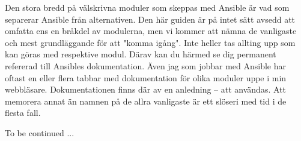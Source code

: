 Den stora bredd på välskrivna moduler som skeppas med Ansible är vad som separerar Ansible från alternativen.
Den här guiden är på intet sätt avsedd att omfatta ens en bråkdel av modulerna, men vi kommer att nämna de
vanligaste och mest grundläggande för att "komma igång". Inte heller tas allting upp som kan göras med respektive
modul. Därav kan du härmed se dig permanent refererad till Ansibles dokumentation. Även jag som jobbar med
Ansible har oftast en eller flera tabbar med dokumentation för olika moduler uppe i min webbläsare. 
Dokumentationen finns där av en anledning -- att användas. Att memorera annat än namnen på de allra vanligaste är
ett slöseri med tid i de flesta fall.

To be continued ...
